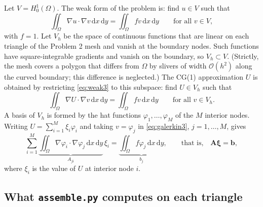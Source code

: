 \documentclass[11pt]{article}
\newcommand{\dxdy}{\,\mathrm{d}x\,\mathrm{d}y}
\newcommand{\Om}{\Omega}
\newcommand{\grad}{\nabla}
\begin{document}
Let $V=H^{1}_{0}(\Om)$.  The weak form of the problem is: find $u\in V$ such
that
\begin{equation}\label{eq:weak3}
  \iint_{\Om}\grad u\cdot\grad v\dxdy=\iint_{\Om}f v\dxdy
  \qquad\text{for all } v\in V,
\end{equation}
with $f=1$.  Let $V_{h}$ be the space of continuous functions that are linear
on each triangle of the Problem 2 mesh and vanish at the boundary nodes.  Such
functions have square-integrable gradients and vanish on the boundary, so
$V_{h}\subset V$.  (Strictly, the mesh covers a polygon that differs from
$\Om$ by slivers of width $\mathcal O(h^{2})$ along the curved boundary; this
difference is neglected.)  The CG(1) approximation $U$ is obtained by
restricting \eqref{eq:weak3} to this subspace: find $U\in V_{h}$ such that
\begin{equation}\label{eq:galerkin3}
  \iint_{\Om}\grad U\cdot\grad v\dxdy=\iint_{\Om}f v\dxdy
  \qquad\text{for all } v\in V_{h}.
\end{equation}
A basis of $V_{h}$ is formed by the hat functions $\varphi_{1},\dots,\varphi_{M}$
of the $M$ interior nodes.  Writing $U=\sum_{i=1}^{M}\xi_{i}\varphi_{i}$ and
taking $v=\varphi_{j}$ in \eqref{eq:galerkin3}, $j=1,\dots,M$, gives
\begin{equation}\label{eq:system3}
  \sum_{i=1}^{M}\underbrace{\iint_{\Om}\grad\varphi_{i}\cdot\grad\varphi_{j}\dxdy}_{A_{ji}}\,\xi_{i}
  =\underbrace{\iint_{\Om}f\varphi_{j}\dxdy}_{b_{j}},
  \qquad\text{that is,}\quad\bm A\bm\xi=\bm b ,
\end{equation}
where $\xi_{i}$ is the value of $U$ at interior node $i$.

\subsection*{What \texttt{assemble.py} computes on each triangle}
\end{document}
